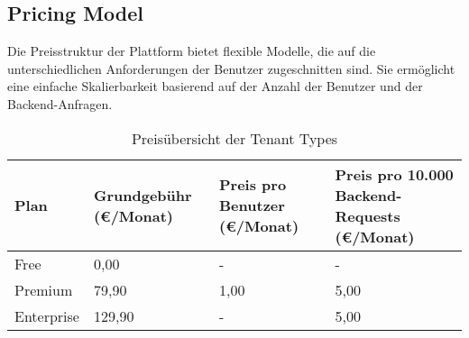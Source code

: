 \subsection{Pricing Model}
Die Preisstruktur der Plattform bietet flexible Modelle, die auf die unterschiedlichen Anforderungen der Benutzer zugeschnitten sind.
Sie ermöglicht eine einfache Skalierbarkeit basierend auf der Anzahl der Benutzer und der Backend-Anfragen.


\begin{table}[h!]
    \centering
    \caption{Preisübersicht der Tenant Types}
    {
        \begin{tabularx}{\textwidth}{|l|X|X|X|}
            \hline
            \textbf{Plan} & \textbf{Grundgebühr (€/Monat)} & \textbf{Preis pro Benutzer (€/Monat)} & \textbf{Preis pro 10.000 Backend-Requests (€/Monat)} \\ \hline
            Free          & 0,00                           & -                                     & -                                                    \\ \hline
            Premium       & 79,90                          & 1,00                                  & 5,00                                                 \\ \hline
            Enterprise    & 129,90                         & -                                     & 5,00                                                 \\ \hline
        \end{tabularx}}
    \label{tab:pricing}
\end{table}


